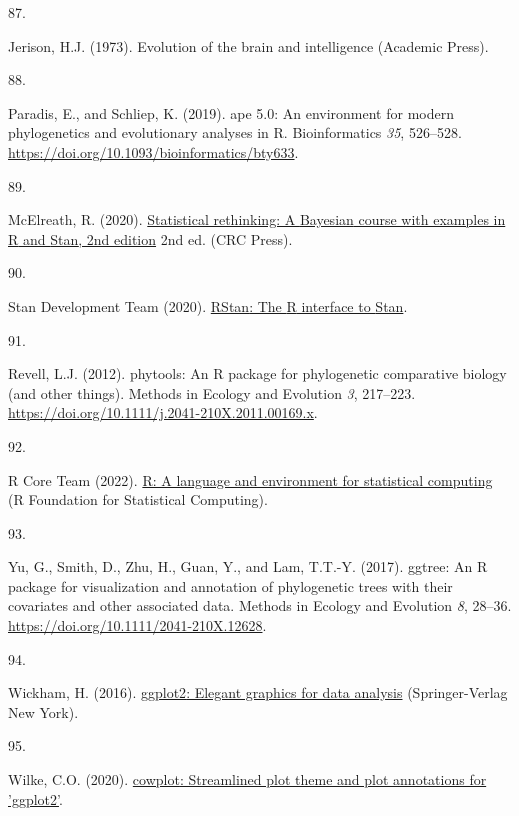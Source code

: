 \documentclass[
  man, donotrepeattitle,floatsintext]{apa6}
\newlength{\cslhangindent}
\newlength{\csllabelwidth}
\newlength{\cslentryspacingunit} %
\newenvironment{CSLReferences}[2] %
 {%
  \setlength{\parindent}{0pt}
  \ifodd #1
  \let\oldpar\par
  \def\par{\hangindent=\cslhangindent\oldpar}
  \fi
  \setlength{\parskip}{#2\cslentryspacingunit}
 }%
 {}
\newcommand{\CSLLeftMargin}[1]{\parbox[t]{\csllabelwidth}{#1}}
\newcommand{\CSLRightInline}[1]{\parbox[t]{\linewidth - \csllabelwidth}{#1}\break}
\begin{document}
\begin{CSLReferences}{0}{0}
\leavevmode{}%
\CSLLeftMargin{87. }%
\CSLRightInline{Jerison, H.J. (1973). Evolution of the brain and intelligence (Academic Press).}

\leavevmode{}%
\CSLLeftMargin{88. }%
\CSLRightInline{Paradis, E., and Schliep, K. (2019). {ape} 5.0: An environment for modern phylogenetics and evolutionary analyses in {R}. Bioinformatics \emph{35}, 526--528. \url{https://doi.org/10.1093/bioinformatics/bty633}.}

\leavevmode{}%
\CSLLeftMargin{89. }%
\CSLRightInline{McElreath, R. (2020). \href{http://xcelab.net/rm/statistical-rethinking/}{Statistical rethinking: A {Bayesian} course with examples in {R} and {Stan}, 2nd edition} 2nd ed. (CRC Press).}

\leavevmode{}%
\CSLLeftMargin{90. }%
\CSLRightInline{Stan Development Team (2020). \href{http://mc-stan.org/}{{RStan}: The {R} interface to {Stan}}.}

\leavevmode{}%
\CSLLeftMargin{91. }%
\CSLRightInline{Revell, L.J. (2012). {phytools}: An {R} package for phylogenetic comparative biology (and other things). Methods in Ecology and Evolution \emph{3}, 217--223. \url{https://doi.org/10.1111/j.2041-210X.2011.00169.x}.}

\leavevmode{}%
\CSLLeftMargin{92. }%
\CSLRightInline{R Core Team (2022). \href{https://www.R-project.org/}{R: A language and environment for statistical computing} (R Foundation for Statistical Computing).}

\leavevmode{}%
\CSLLeftMargin{93. }%
\CSLRightInline{Yu, G., Smith, D., Zhu, H., Guan, Y., and Lam, T.T.-Y. (2017). {ggtree}: An {R} package for visualization and annotation of phylogenetic trees with their covariates and other associated data. Methods in Ecology and Evolution \emph{8}, 28--36. \url{https://doi.org/10.1111/2041-210X.12628}.}

\leavevmode{}%
\CSLLeftMargin{94. }%
\CSLRightInline{Wickham, H. (2016). \href{https://ggplot2.tidyverse.org}{{ggplot2}: Elegant graphics for data analysis} (Springer-Verlag New York).}

\leavevmode{}%
\CSLLeftMargin{95. }%
\CSLRightInline{Wilke, C.O. (2020). \href{https://CRAN.R-project.org/package=cowplot}{{cowplot}: Streamlined plot theme and plot annotations for 'ggplot2'}.}


\end{CSLReferences}
\end{document}
